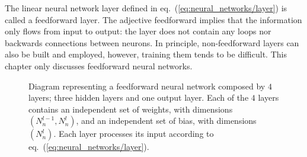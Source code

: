 The linear neural network layer defined in eq.~(\ref{eq:neural_networks/layer}) is called a
feedforward layer. The adjective feedforward implies that the information only flows from input to
output: the layer does not contain any loops nor backwards connections between neurons. In
principle, non-feedforward layers can also be built and employed, however, training them tends to be
difficult. This chapter only discusses feedforward neural networks.

\begin{figure}[H]
	\centering
	\caption{
        Diagram representing a feedforward neural network composed by $4$ layers; three hidden
        layers and one output layer. Each of the $4$ layers contains an independent set of weights,
        with dimensions $(N_{n}^{l-1}, N_{n}^{l})$, and an independent set of bias, with dimensions
        $(N_{n}^{l})$. Each layer processes its input according to
        eq.~(\ref{eq:neural_networks/layer}).
    }\label{fig:neural_networks/neural_network}
\end{figure}
